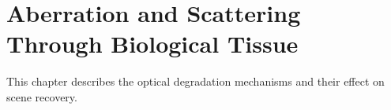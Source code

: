 \chapter{Aberration and Scattering Through Biological Tissue}

This chapter describes the optical degradation mechanisms and their effect on
scene recovery.

